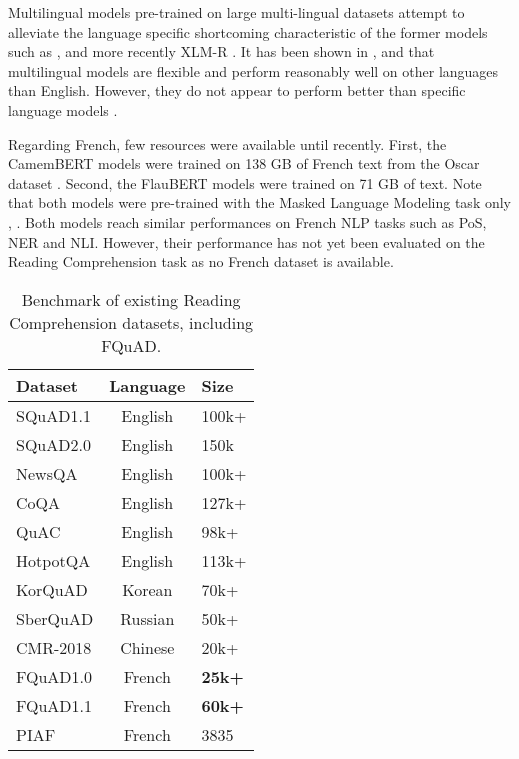 \documentclass{article}
\begin{document}
Multilingual models pre-trained on large multi-lingual datasets attempt to alleviate the language specific shortcoming characteristic of the former models such as \citep{xlm}, \citep{multilingual-bert} and more recently XLM-R \citep{xlmr}.
It has been shown in \citep{xlmr}, \citep{xquad} and \citep{mlqa} that multilingual models are flexible and perform reasonably well on other languages than English.
However, they do not appear to perform better than specific language models \citep{mlqa}.

Regarding French, few resources were available until recently. 
First, the CamemBERT models \citep{camembert} were trained on 138 GB of French text from the Oscar dataset \citep{oscar_dataset}.
Second, the FlauBERT models \citep{flaubert} were trained on 71 GB of text.
Note that both models were pre-trained with the Masked Language Modeling task only \citep{camembert}, \citep{flaubert}.
Both models reach similar performances on French NLP tasks such as PoS, NER and NLI. 
However, their performance has not yet been evaluated on the Reading Comprehension task as no French dataset is available.

\begin{table}[ht]
    \centering
    \begin{tabular}{l c l}
        Dataset & Language & Size \\
        \hline
        SQuAD1.1 & English & 100k+ \\
        SQuAD2.0 & English & 150k \\
        NewsQA   & English & 100k+ \\
        CoQA     & English & 127k+ \\
        QuAC     & English & 98k+ \\
        HotpotQA & English & 113k+ \\
        \hline
        KorQuAD & Korean & 70k+ \\
        \hline
        SberQuAD & Russian & 50k+ \\
        \hline
        CMR-2018 & Chinese & 20k+ \\
        \hline
        FQuAD1.0 & French & \textbf{25k+} \\
        FQuAD1.1 & French & \textbf{60k+} \\
        PIAF & French & 3835 \\
        \hline
    \end{tabular}
    \caption{Benchmark of existing Reading Comprehension datasets, including FQuAD.}
    \label{tab:dataset-benchmark}
\end{table}
\end{document}

